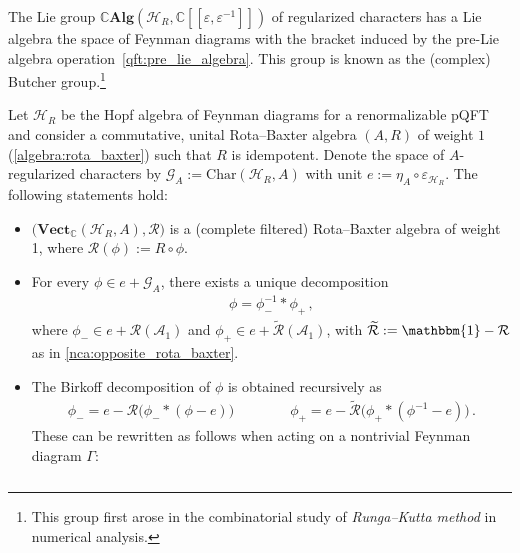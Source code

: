     \begin{property}
        The Lie group $\mathbb{C}\mathbf{Alg}(\mathcal{H}_R,\mathbb{C}[[\varepsilon,\varepsilon^{-1}]])$ of regularized characters has a Lie algebra the space of Feynman diagrams with the bracket induced by the pre-Lie algebra operation~\eqref{qft:pre_lie_algebra}. This group is known as the (complex) Butcher group.\footnote{This group first arose in the combinatorial study of \textit{Runga--Kutta method} in numerical analysis.}
    \end{property}

    \begin{theorem}
        Let $\mathcal{H}_R$ be the Hopf algebra of Feynman diagrams for a renormalizable pQFT and consider a commutative, unital Rota--Baxter algebra $(A,R)$ of weight $1$ (\cref{algebra:rota_baxter}) such that $R$ is idempotent. Denote the space of $A$-regularized characters by $\mathcal{G}_A:=\mathrm{Char}(\mathcal{H}_R,A)$ with unit $e:=\eta_A\circ\varepsilon_{\mathcal{H}_R}$. The following statements hold:
        \begin{itemize}
            \item $\bigl(\mathbf{Vect}_{\mathbb{C}}(\mathcal{H}_R,A),\mathcal{R}\bigr)$ is a (complete filtered) Rota--Baxter algebra of weight 1, where $\mathcal{R}(\phi):=R\circ\phi$.
            \item For every $\phi\in e+\mathcal{G}_A$, there exists a unique decomposition
            \begin{gather}
                \phi = \phi_-^{-1}\ast\phi_+\,,
            \end{gather}
            where $\phi_-\in e+\mathcal{R}(\mathcal{A}_1)$ and $\phi_+\in e+\widetilde{\mathcal{R}}(\mathcal{A}_1)$, with $\widetilde{\mathcal{R}}:=\mathbbm{1}-\mathcal{R}$ as in \cref{nca:opposite_rota_baxter}.
            \item The Birkoff decomposition of $\phi$ is obtained recursively as
            \begin{gather}
                \phi_- = e - \mathcal{R}\bigl(\phi_-\ast(\phi-e)\bigr) \qquad\qquad \phi_+=e - \widetilde{\mathcal{R}}\bigl(\phi_+\ast(\phi^{-1}-e)\bigr)\,.
            \end{gather}
            These can be rewritten as follows when acting on a nontrivial Feynman diagram $\Gamma$:
            \begin{gather}
                \begin{aligned}

\end{aligned}
\end{gather}
\end{itemize}
\end{theorem}
